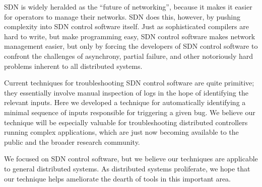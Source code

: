 
SDN is widely heralded as the ``future of networking'', because it makes it
easier for operators to manage their networks. SDN does this, however, by
pushing complexity into SDN control software itself. Just as sophisticated
compilers are hard to write, but make programming easy, SDN control software makes
network management easier, but only by forcing the developers of
SDN control software to confront the challenges of asynchrony, partial failure, and
other notoriously hard problems inherent to all distributed systems.

Current techniques for troubleshooting SDN control software are quite primitive; they
essentially involve manual inspection of logs in the hope of identifying the
relevant inputs. Here we developed a technique for automatically
identifying a minimal sequence of inputs responsible for triggering a given
bug. We believe our technique will be especially valuable for troubleshooting
distributed controllers running complex applications, which are just now
becoming available to the public and the broader research community.

We focused on SDN control software, but we believe our techniques
are applicable to general distributed systems. As distributed systems
proliferate, we hope that our technique helps ameliorate the dearth of
tools in this important area.


